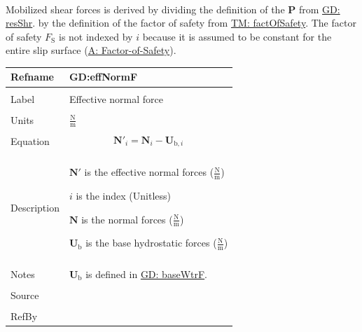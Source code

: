 \documentclass[12pt]{article}
\begin{document}
\paragraph{}
\label{GD:mobShrDeriv}
Mobilized shear forces is derived by dividing the definition of the $\mathbf{P}$ from \hyperref[GD:resShr]{GD: resShr}. by the definition of the factor of safety from \hyperref[TM:factOfSafety]{TM: factOfSafety}. The factor of safety ${F_{\text{S}}}$ is not indexed by $i$ because it is assumed to be constant for the entire slip surface (\hyperref[assumpFOS]{A: Factor-of-Safety}).

\vspace{\baselineskip}
\noindent
\begin{minipage}{\textwidth}
\begin{tabular}{>{\raggedright}p{}>{\raggedright\arraybackslash}p{}}
\toprule \textbf{Refname} & \textbf{GD:effNormF}
\label{GD:effNormF}
\\ \midrule \\
Label & Effective normal force
        
\\ \midrule \\
Units & $\frac{\text{N}}{\text{m}}$
        
\\ \midrule \\
Equation & \begin{displaymath}
           {\mathbf{N'}}_{i}={\mathbf{N}}_{i}-{\mathbf{U}_{\text{b},i}}
           \end{displaymath}
\\ \midrule \\
Description & \begin{symbDescription}
              \item{$\mathbf{N'}$ is the effective normal forces ($\frac{\text{N}}{\text{m}}$)}
              \item{$i$ is the index (Unitless)}
              \item{$\mathbf{N}$ is the normal forces ($\frac{\text{N}}{\text{m}}$)}
              \item{${\mathbf{U}_{\text{b}}}$ is the base hydrostatic forces ($\frac{\text{N}}{\text{m}}$)}
              \end{symbDescription}
\\ \midrule \\
Notes & ${\mathbf{U}_{\text{b}}}$ is defined in \hyperref[GD:baseWtrF]{GD: baseWtrF}.
        
\\ \midrule \\
Source & \cite{chen2005}
         
\\ \midrule \\
RefBy & 
\\ \bottomrule
\end{tabular}
\end{minipage}
\end{document}
